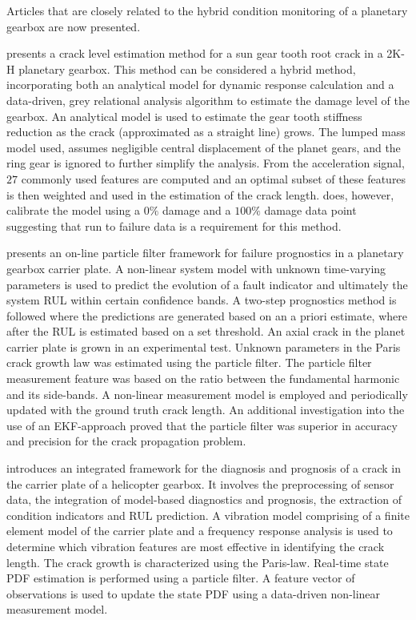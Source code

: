 

Articles that are closely related to the hybrid condition monitoring of a planetary gearbox are now presented. 

\cite{Li2005} \cite{Li200}

\cite{Cheng2012} presents a crack level estimation method for a sun gear tooth root crack in a 2K-H planetary gearbox. This method can be considered a hybrid method, incorporating both an analytical model for dynamic response calculation and a data-driven, grey relational analysis algorithm to estimate the damage level of the gearbox. An analytical model is used to estimate the gear tooth stiffness reduction as the crack (approximated as a straight line) grows. The lumped mass model used, assumes negligible central displacement of the planet gears, and the ring gear is ignored to further simplify the analysis. From the acceleration signal, $27$ commonly used features are computed and an optimal subset of these features is then weighted and used in the estimation of the crack length. \cite{Cheng2012} does, however, calibrate the model using a $0\%$ damage and a $100\%$ damage data point suggesting that run to failure data is a requirement for this method.

\cite{Orchard2007} presents an on-line particle filter framework for failure prognostics in a planetary gearbox carrier plate. A non-linear system model with unknown time-varying parameters is used to predict the evolution of a fault indicator and ultimately the system RUL within certain confidence bands. A two-step prognostics method is followed where the predictions are generated based on an a priori estimate, where after the RUL is estimated based on a set threshold. An axial crack in the planet carrier plate is grown in an experimental test. Unknown parameters in the Paris crack growth law was estimated using the particle filter. The particle filter measurement feature was based on the ratio between the fundamental harmonic and its side-bands. A non-linear measurement model is employed and periodically updated with the ground truth crack length. An additional investigation into the use of an EKF-approach proved that the particle filter was superior in accuracy and precision for the crack propagation problem. 


\cite{Patricks2007} introduces an integrated framework for the diagnosis and prognosis of a crack in the carrier plate of a helicopter gearbox. It involves the preprocessing of sensor data, the integration of model-based diagnostics and prognosis, the extraction of condition indicators and RUL prediction. A vibration model comprising of a finite element model of the carrier plate and a frequency response analysis is used to determine which vibration features are most effective in identifying the crack length.  The crack growth is characterized using the Paris-law. Real-time state PDF estimation is performed using a particle filter. A feature vector of observations is used to update the state PDF using a data-driven non-linear measurement model.



